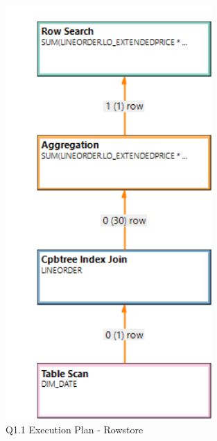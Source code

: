 \begin{figure}[H]
	\centering
	\includegraphics[width=0.7\textwidth]{images/q1-1-row-exec.png}
	\caption{Q1.1 Execution Plan - Rowstore}\label{exec:q1.1-row}
\end{figure}
